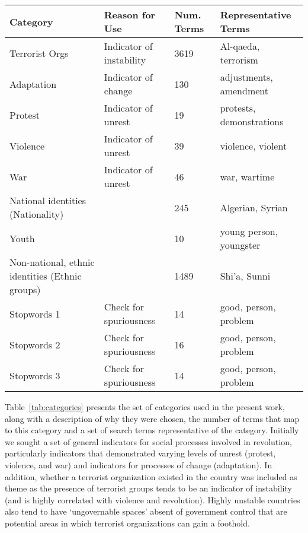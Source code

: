 \begin{table*}[t]
\begin{tabularx}{\textwidth}{| m{4.5cm} | m{4cm} | m{1.5cm} | X |}
	\hline 
	{\bf Category} & {\bf Reason for Use} & {\bf Num. Terms} & {\bf Representative Terms} \\ \hline
	  Terrorist Orgs  & Indicator of instability & 3619 & Al-qaeda, terrorism \\ \hline
	   Adaptation & Indicator of change & 130 & adjustments,  amendment \\ \hline
      Protest &  Indicator of unrest & 19 & protests, demonstrations \\ \hline
   Violence & Indicator of unrest & 39 & violence, violent \\ \hline
    War & Indicator of unrest & 46 &  war, wartime \\ \hline
    National identities (Nationality) & \cite{goldstone_cross-class_2011}& 245 & Algerian, Syrian \\ \hline  
   Youth & \cite{goldstone_cross-class_2011} &   10 & young person, youngster \\ \hline
   Non-national, ethnic identities (Ethnic groups) & \cite{goldstone_cross-class_2011} & 1489 & Shi'a, Sunni \\ \hline
   Stopwords 1 & Check for spuriousness & 14 & good, person, problem  \\ \hline
 Stopwords 2 & Check for spuriousness & 16 & good, person, problem \\ \hline
 Stopwords 3 & Check for spuriousness & 14 & good, person, problem\\ \hline
\end{tabularx}
	\caption{Categories Used}
	\label{tab:categories}
\end{table*}

Table~\ref{tab:categories} presents the set of categories used in the present work, along with a description of why they were chosen, the number of terms that map to this category and a set of search terms representative of the category. Initially we sought a set of general indicators for social processes involved in revolution, particularly indicators that demonstrated varying levels of unrest (protest, violence, and war) and indicators for processes of change (adaptation). In addition, whether a terrorist organization existed in the country was included as theme as the presence of terrorist groups tends to be an indicator of instability (and is highly correlated with violence and revolution). Highly unstable countries also tend to have ‘ungovernable spaces’ absent of government control that are potential areas in which terrorist organizations can gain a foothold. 


